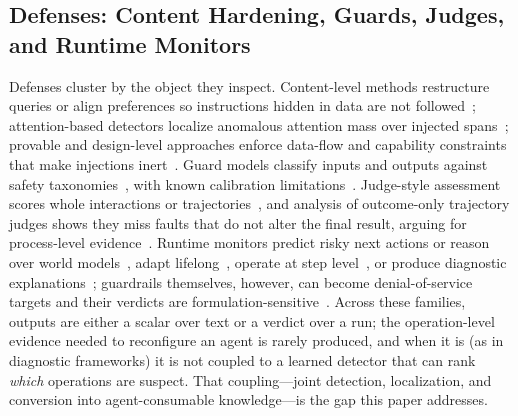 \subsection{Defenses: Content Hardening, Guards, Judges, and Runtime Monitors}
Defenses cluster by the object they inspect. Content-level methods restructure queries or align preferences so instructions hidden in data are not followed~\cite{chen2024struq,chen2024secalign}; attention-based detectors localize anomalous attention mass over injected spans~\cite{zhong2025attention}; provable and design-level approaches enforce data-flow and capability constraints that make injections inert~\cite{zhu2025melon,debenedetti2025defeating}. Guard models classify inputs and outputs against safety taxonomies~\cite{inan2023llama}, with known calibration limitations~\cite{liu2024calibration}. Judge-style assessment scores whole interactions or trajectories~\cite{zheng2023judging,yuan2024rjudge,zhuge2024agentasajudge}, and analysis of outcome-only trajectory judges shows they miss faults that do not alter the final result, arguing for process-level evidence~\cite{mohammadi2026trajectoryjudge}. Runtime monitors predict risky next actions or reason over world models~\cite{wang2025probguard,lin2026dreamguard}, adapt lifelong~\cite{luo2025agrail}, operate at step level~\cite{mou2026toolsafe}, or produce diagnostic explanations~\cite{liu2026agentdog}; guardrails themselves, however, can become denial-of-service targets and their verdicts are formulation-sensitive~\cite{zhou2026from}. Across these families, outputs are either a scalar over text or a verdict over a run; the operation-level evidence needed to reconfigure an agent is rarely produced, and when it is (as in diagnostic frameworks) it is not coupled to a learned detector that can rank \emph{which} operations are suspect. That coupling---joint detection, localization, and conversion into agent-consumable knowledge---is the gap this paper addresses.


